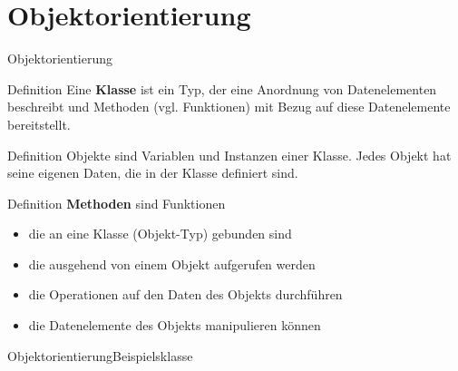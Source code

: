 \documentclass[xelatex,aspectratio=169]{beamer}
\begin{document}
\section{Objektorientierung}

\begin{frame}{Objektorientierung}
    \begin{block}{Definition}
        Eine \textbf{Klasse} ist ein Typ, der eine Anordnung von Datenelementen beschreibt und Methoden (vgl. Funktionen) mit Bezug auf diese Datenelemente bereitstellt.
    \end{block}
    \begin{block}{Definition}
        Objekte sind Variablen und Instanzen einer Klasse. Jedes Objekt hat seine eigenen Daten, die in der Klasse definiert sind.
    \end{block}
    \begin{block}{Definition}
        \textbf{Methoden} sind Funktionen
        \begin{itemize}
            \item die an eine Klasse (Objekt-Typ) gebunden sind
            \item die ausgehend von einem Objekt aufgerufen werden
            \item die Operationen auf den Daten des Objekts durchführen
            \item die Datenelemente des Objekts manipulieren können
        \end{itemize}
    \end{block}

\end{frame}

\begin{frame}{Objektorientierung}{Beispielsklasse}
    \smaller
    \inputminted[escapeinside=$$]{python}{src/class_bike_annotated.py}


\end{frame}
\end{document}
